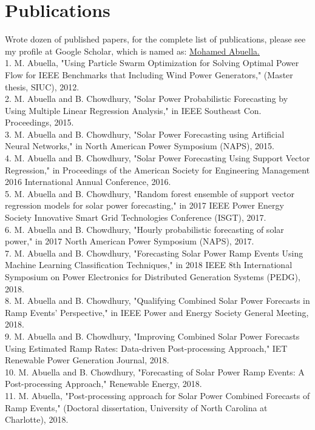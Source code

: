 \documentclass[11pt,letterpaper,sans]{moderncv}
\begin{document}
\section{Publications}
Wrote dozen of published papers, for the complete list of publications, please see my profile at Google Scholar, which is named as:
\href{https://scholar.google.com/citations?user=nJbFUkcAAAAJ&hl=en}{\underline{\textcolor[rgb]{0.00,0.07,1.00}{Mohamed Abuella}}.}\\
1. M. Abuella, "Using Particle Swarm Optimization for Solving Optimal Power Flow for IEEE Benchmarks that Including Wind Power Generators," (Master thesis, SIUC), 2012.\\
2. M. Abuella and B. Chowdhury, "Solar Power Probabilistic Forecasting by Using Multiple Linear Regression Analysis," in IEEE Southeast Con. Proceedings, 2015.\\
3. M. Abuella and B. Chowdhury, "Solar Power Forecasting using Artificial Neural Networks," in North American Power Symposium (NAPS), 2015.\\
4. M. Abuella and B. Chowdhury, "Solar Power Forecasting Using Support Vector Regression," in Proceedings of the American Society for Engineering Management 2016 International Annual Conference, 2016.\\
5. M. Abuella and B. Chowdhury, "Random forest ensemble of support vector regression models for solar power forecasting," in 2017 IEEE Power Energy Society Innovative Smart Grid Technologies Conference (ISGT), 2017.\\
6. M. Abuella and B. Chowdhury, "Hourly probabilistic forecasting of solar power," in 2017 North American Power Symposium (NAPS), 2017.\\
7. M. Abuella and B. Chowdhury, "Forecasting Solar Power Ramp Events Using Machine Learning Classification Techniques," in 2018 IEEE 8th International Symposium on Power Electronics for Distributed Generation Systems (PEDG), 2018.\\
8. M. Abuella and B. Chowdhury, "Qualifying Combined Solar Power Forecasts in Ramp Events' Perspective," in IEEE Power and Energy Society General Meeting, 2018.\\
9. M. Abuella and B. Chowdhury, "Improving Combined Solar Power Forecasts Using Estimated Ramp Rates: Data-driven Post-processing Approach," IET Renewable Power Generation Journal, 2018.\\
10. M. Abuella and B. Chowdhury, "Forecasting of Solar Power Ramp Events: A Post-processing Approach," Renewable Energy, 2018.\\
11. M. Abuella, "Post-processing approach for Solar Power Combined Forecasts of Ramp Events," (Doctoral dissertation, University of North Carolina at Charlotte), 2018.
\end{document}
